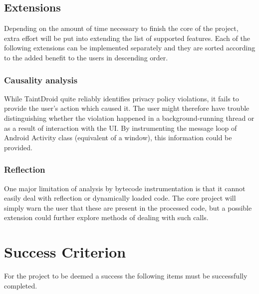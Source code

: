 \documentclass[12pt]{article}
\begin{document}
\subsection*{Extensions}

Depending on the amount of time necessary to finish the core of the project,
extra effort will be put into extending the list of supported features. Each 
of the following extensions can be implemented separately and they are 
sorted according to the added benefit to the users in descending order.

\subsubsection*{Causality analysis}

While TaintDroid quite reliably identifies privacy policy violations,
it fails to provide the user's action which caused it. The user 
might therefore have trouble distinguishing whether the violation 
happened in a background-running thread or as a result of interaction
with the UI. By instrumenting the message loop of Android Activity class
(equivalent of a window), this information could be provided.

\subsubsection*{Reflection}

One major limitation of analysis by bytecode instrumentation is that it 
cannot easily deal with reflection or dynamically loaded code. The core
project will simply warn the user that these are present in the processed
code, but a possible extension could further explore methods of dealing 
with such calls.

\section*{Success Criterion}

For the project to be deemed a success the following items must be
successfully completed.
\end{document}
